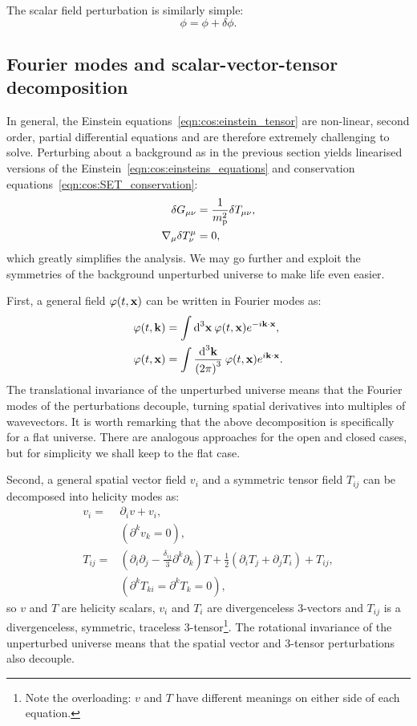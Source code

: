 The scalar field perturbation is similarly simple:
\begin{equation}
  \phi = \phi + \delta\phi.
\end{equation}

\subsection{Fourier modes and scalar-vector-tensor decomposition}
In general, the Einstein equations~\eqref{eqn:cos:einstein_tensor} are non-linear, second order, partial differential equations and are therefore extremely challenging to solve. Perturbing about a background as in the previous section yields linearised versions of the Einstein~\eqref{eqn:cos:einsteins_equations} and conservation equations~\eqref{eqn:cos:SET_conservation}:
\begin{align}
  \delta G_{\mu\nu} &= \frac{1}{\m^2}\delta T_{\mu\nu},
  \label{eqn:cos:einsteins_equations_perturb} \\
  \nabla_\mu\delta T^{\mu}_{\nu} &=0,
  \label{eqn:cos:SET_conservation_perturb}
\end{align}
which greatly simplifies the analysis.  
We may go further and exploit the symmetries of the background unperturbed universe to make life even easier.

First, a general field $\varphi(t,\vx)$ can be written in Fourier modes as:
\begin{align}
  \varphi(t,\vk) &= \int \d[3]{\vx}\: \varphi(t,\vx) e^{-i\vk \cdot \vx},\\
  \varphi(t,\vx) &= \int \frac{\d[3]{\vk}}{{(2\pi)}^3}\: \varphi(t,\vx) e^{i\vk \cdot \vx}.
\end{align}
The translational invariance of the unperturbed universe means that the Fourier modes of the perturbations decouple, turning spatial derivatives into multiples of wavevectors. 
It is worth remarking that the above decomposition is specifically for a flat universe. There are analogous approaches for the open and closed cases, but for simplicity we shall keep to the flat case. 

Second, a general spatial vector field $v_i$ and a symmetric tensor field $T_{ij}$ can be decomposed into helicity modes as:
\begin{align}
  v_i =& \partial_i v + v_i,   \nonumber\\
  &(\partial^k v_k=0), \\
  T_{ij} =& (\partial_i\partial_j - \frac{\delta_{ij}}{3}\partial^k\partial_k)T + \frac{1}{2}(\partial_i T_j + \partial_j T_i) + T_{ij} \nonumber,\\ 
  &(\partial^k T_{ki} = \partial^k T_k = 0),
\end{align}
so $v$ and $T$ are helicity scalars, $v_i$ and $T_i$ are divergenceless 3-vectors and $T_{ij}$ is a divergenceless, symmetric, traceless 3-tensor\footnote{Note the overloading: $v$ and $T$ have different meanings on either side of each equation.}.
  The rotational invariance of the unperturbed universe means that the spatial vector and 3-tensor perturbations also decouple.

